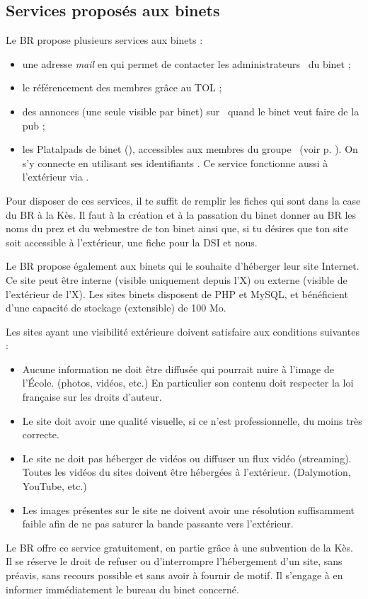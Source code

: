 \subsection{Services propos\'es aux binets}

Le BR propose plusieurs services aux binets :
\begin{itemize}
\item une adresse \emph{mail} en  qui permet de contacter les administrateurs \fkz\ du binet ;
\item le référencement des membres grâce au TOL ;
\item des annonces (une seule visible par binet) sur \fkz\ quand le binet veut faire de la pub ;
\item les Platalpads de binet (), accessibles aux membres du groupe \fkz\ (voir p. \pageref{platalpad}).
On s'y connecte en utilisant ses identifiants \fkz. Ce service fonctionne aussi \`a l'ext\'erieur via
.
\end{itemize}

Pour disposer de ces services, il te suffit de remplir les fiches qui sont dans la case du BR à la Kès. Il faut à la création et à la passation du binet
donner au BR les noms du prez et du webmestre de ton binet ainsi que, si tu désires que ton site soit accessible à l'extérieur, une fiche pour la DSI et nous.

Le BR propose également aux binets qui le souhaite d'héberger leur site Internet. Ce site peut être interne (visible uniquement depuis l'X) ou externe (visible de l'extérieur de l'X).
Les sites binets disposent de PHP et MySQL, et bénéficient d'une capacité de stockage (extensible) de 100 Mo.

Les sites ayant une visibilité extérieure doivent satisfaire aux conditions suivantes :
\begin{itemize}
    \item Aucune information ne doit être diffusée qui pourrait nuire à l'image de l’École. (photos, vidéos, etc.) En particulier son contenu doit respecter la loi française sur les droits d'auteur.
    \item Le site doit avoir une qualité visuelle, si ce n'est professionnelle, du moins très correcte.
    \item Le site ne doit pas héberger de vidéos ou diffuser un flux vidéo (streaming). Toutes les vidéos du sites doivent être hébergées à l'extérieur. (Dalymotion, YouTube, etc.)
    \item Les images présentes sur le site ne doivent avoir une résolution suffisamment faible afin de ne pas saturer la bande passante vers l'extérieur. 
\end{itemize}

Le BR offre ce service gratuitement, en partie grâce à une subvention de la Kès.
Il se réserve le droit de refuser ou d'interrompre l'hébergement d'un site, sans préavis, sans recours possible et sans avoir à fournir de motif.
Il s'engage à en informer immédiatement le bureau du binet concerné. 